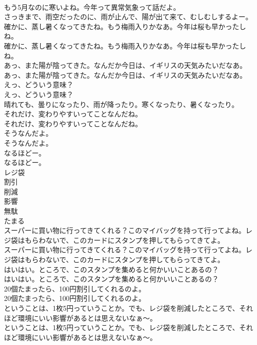 \documentclass[8pt]{extreport}
\begin{document}
\begin{CJK}{UTF8}{min}
\\	もう5月なのに寒いよね。今年って異常気象って話だよ。 
\\	さっきまで、雨空だったのに、雨が止んで、陽が出て来て、むしむしするよー。	
\\	確かに、蒸し暑くなってきたね。もう梅雨入りかなあ。今年は桜も早かったしね。	
\\	確かに、蒸し暑くなってきたね。もう梅雨入りかなあ。今年は桜も早かったしね。 
\\	あっ、また陽が陰ってきた。なんだか今日は、イギリスの天気みたいだなあ。	
\\	あっ、また陽が陰ってきた。なんだか今日は、イギリスの天気みたいだなあ。 
\\	えっ、どういう意味？	
\\	えっ、どういう意味？ 
\\	晴れても、曇りになったり、雨が降ったり。寒くなったり、暑くなったり。	
\\	それだけ、変わりやすいってことなんだね。	
\\	それだけ、変わりやすいってことなんだね。 
\\	そうなんだよ。	
\\	そうなんだよ。 
\\	なるほどー。	
\\	なるほどー。 
\\	レジ袋
\\	割引
\\	削減
\\	影響
\\	無駄
\\	たまる
\\	スーパーに買い物に行ってきてくれる？このマイバッグを持って行ってよね。レジ袋はもらわないで、このカードにスタンプを押してもらってきてよ。	
\\	スーパーに買い物に行ってきてくれる？このマイバッグを持って行ってよね。レジ袋はもらわないで、このカードにスタンプを押してもらってきてよ。 
\\	はいはい。ところで、このスタンプを集めると何かいいことあるの？	
\\	はいはい。ところで、このスタンプを集めると何かいいことあるの？ 
\\	20個たまったら、100円割引してくれるのよ。	
\\	20個たまったら、100円割引してくれるのよ。 
\\	ということは、1枚5円っていうことか。でも、レジ袋を削減したところで、それほど環境にいい影響があるとは思えないなぁ～。	
\\	ということは、1枚5円っていうことか。でも、レジ袋を削減したところで、それほど環境にいい影響があるとは思えないなぁ～。 

\end{CJK}
\end{document}
